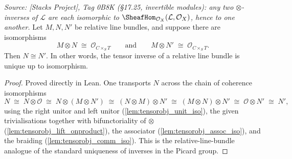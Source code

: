\begin{lemma}
  \label{lem:rel_pic_sharp_inverse_unique}
  \textit{Source: [Stacks Project], Tag 0B8K (\S 17.25, invertible modules): any
  two \(\otimes\)-inverses of \(\mathcal{L}\) are each isomorphic to
  \(\SheafHom_{\mathcal{O}_X}(\mathcal{L}, \mathcal{O}_X)\), hence to one
  another.}
  Let \(M, N, N'\) be relative line bundles, and suppose there are
  isomorphisms
  \[
    M \otimes N \;\cong\; \mathcal{O}_{C \times_S T}
    \qquad\text{and}\qquad
    M \otimes N' \;\cong\; \mathcal{O}_{C \times_S T}.
  \]
  Then \(N \cong N'\). In other words, the tensor inverse of a relative line
  bundle is unique up to isomorphism.
\end{lemma}

\begin{proof}
    \leanok
  Proved directly in Lean. One transports \(N\) across the chain of coherence
  isomorphisms
  \[
    N \;\cong\; N \otimes \mathcal{O}
      \;\cong\; N \otimes (M \otimes N')
      \;\cong\; (N \otimes M) \otimes N'
      \;\cong\; (M \otimes N) \otimes N'
      \;\cong\; \mathcal{O} \otimes N'
      \;\cong\; N',
  \]
  using the right unitor and left unitor (\cref{lem:tensorobj_unit_iso}), the
  given trivialisations together with bifunctoriality of \(\otimes\)
  (\cref{lem:tensorobj_lift_onproduct}), the associator
  (\cref{lem:tensorobj_assoc_iso}), and the braiding
  (\cref{lem:tensorobj_comm_iso}). This is the relative-line-bundle analogue of
  the standard uniqueness of inverses in the Picard group.
\end{proof}

